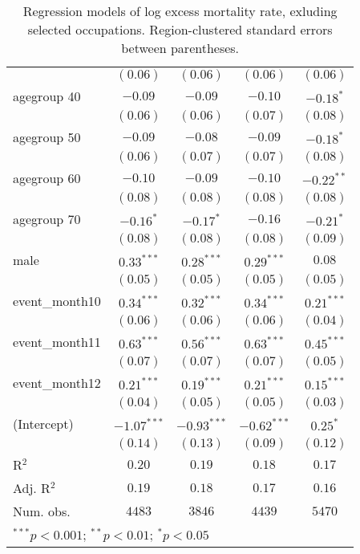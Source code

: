 \begin{table}
\begin{center}
\begin{tabular}{l c c c c}
                & $(0.06)$      & $(0.06)$      & $(0.06)$      & $(0.06)$      \\
agegroup 40     & $-0.09$       & $-0.09$       & $-0.10$       & $-0.18^{*}$   \\
                & $(0.06)$      & $(0.06)$      & $(0.07)$      & $(0.08)$      \\
agegroup 50     & $-0.09$       & $-0.08$       & $-0.09$       & $-0.18^{*}$   \\
                & $(0.06)$      & $(0.07)$      & $(0.07)$      & $(0.08)$      \\
agegroup 60     & $-0.10$       & $-0.09$       & $-0.10$       & $-0.22^{**}$  \\
                & $(0.08)$      & $(0.08)$      & $(0.08)$      & $(0.08)$      \\
agegroup 70     & $-0.16^{*}$   & $-0.17^{*}$   & $-0.16$       & $-0.21^{*}$   \\
                & $(0.08)$      & $(0.08)$      & $(0.08)$      & $(0.09)$      \\
male            & $0.33^{***}$  & $0.28^{***}$  & $0.29^{***}$  & $0.08$        \\
                & $(0.05)$      & $(0.05)$      & $(0.05)$      & $(0.05)$      \\
event\_month10  & $0.34^{***}$  & $0.32^{***}$  & $0.34^{***}$  & $0.21^{***}$  \\
                & $(0.06)$      & $(0.06)$      & $(0.06)$      & $(0.04)$      \\
event\_month11  & $0.63^{***}$  & $0.56^{***}$  & $0.63^{***}$  & $0.45^{***}$  \\
                & $(0.07)$      & $(0.07)$      & $(0.07)$      & $(0.05)$      \\
event\_month12  & $0.21^{***}$  & $0.19^{***}$  & $0.21^{***}$  & $0.15^{***}$  \\
                & $(0.04)$      & $(0.05)$      & $(0.05)$      & $(0.03)$      \\
(Intercept)     & $-1.07^{***}$ & $-0.93^{***}$ & $-0.62^{***}$ & $0.25^{*}$    \\
                & $(0.14)$      & $(0.13)$      & $(0.09)$      & $(0.12)$      \\
\hline
R$^2$           & $0.20$        & $0.19$        & $0.18$        & $0.17$        \\
Adj. R$^2$      & $0.19$        & $0.18$        & $0.17$        & $0.16$        \\
Num. obs.       & $4483$        & $3846$        & $4439$        & $5470$        \\
\hline
\multicolumn{5}{l}{\scriptsize{$^{***}p<0.001$; $^{**}p<0.01$; $^{*}p<0.05$}}
\end{tabular}
\caption{Regression models of log excess mortality rate, exluding selected occupations. Region-clustered standard errors between parentheses.}
\label{tab:altoccmodels}
\end{center}
\end{table}
